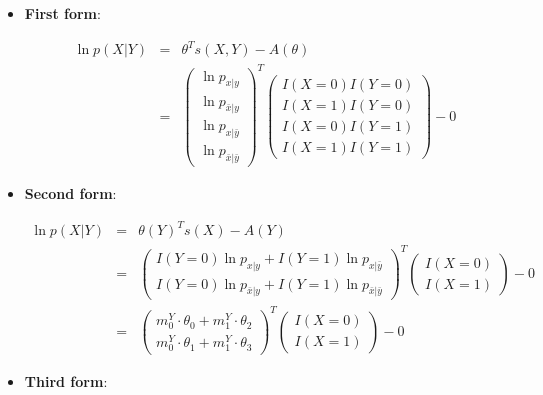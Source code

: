 \documentclass[11pt, oneside]{article}   	%
\numberwithin{figure}{section}
\numberwithin{equation}{section}
\numberwithin{table}{section}
\begin{document}
\begin{itemize}

\item \textbf{First form}:

\begin{eqnarray*}
\ln p(X|Y) &=& \theta^T s(X,Y) - A(\theta) \\
&=&
\begin{pmatrix}
\ln p_{x|y}\\
\ln p_{\bar{x}|y}\\
\ln p_{x|\bar{y}}\\
\ln p_{\bar{x}|\bar{y}}
\end{pmatrix}^T
\begin{pmatrix}
I(X=0)I(Y=0) \\
I(X=1)I(Y=0) \\
I(X=0)I(Y=1) \\
I(X=1)I(Y=1) 
\end{pmatrix}
- 0
\end{eqnarray*}

\item \textbf{Second form}:

\begin{eqnarray*}
\ln p(X|Y) &=& \theta(Y)^Ts(X) - A(Y) \\
&=&
\begin{pmatrix}
I(Y=0)\ln p_{x|y}  + I(Y=1)\ln p_{x|\bar{y}}\\
I(Y=0)\ln p_{\bar{x}|y}  + I(Y=1)\ln p_{\bar{x}|\bar{y}}
\end{pmatrix}^T
\begin{pmatrix}
I(X=0) \\
I(X=1)
\end{pmatrix}
- 0 \\
&=&
\begin{pmatrix}
m^Y_0\cdot\theta_0  + m^Y_1\cdot\theta_2\\
m^Y_0\cdot\theta_1  + m^Y_1\cdot\theta_3
\end{pmatrix}^T
\begin{pmatrix}
I(X=0) \\
I(X=1)
\end{pmatrix}
- 0 
\end{eqnarray*}

\item \textbf{Third form}:


\end{itemize}
\end{document}
